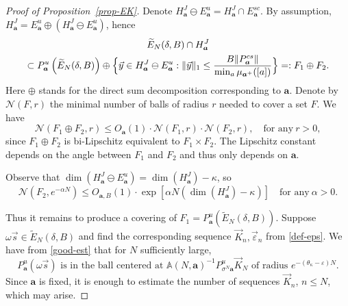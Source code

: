 \documentclass[11pt]{article}
\numberwithin{equation}{section}\newcommand{\Relation}[2][]{}\newtheorem*{prop*}{Proposition}
\newcommand{\sep}{:}
\let\epsilon\varepsilon
\theoremstyle{plain}
\theoremstyle{definition}
\let\wt\widetilde
\newcommand\bom{{\boldsymbol a}}\let\ba\bom
\let\eps\varepsilon
\let\om\omega
\let\sig\sigma
\newcommand\Ns{{\mathscr N}}
\newcommand\Aa{\mathbb{A}}
\newcommand\be{\begin{equation}}
\newcommand\ee{\end{equation}}
\begin{document}
\begin{proof}[Proof of Proposition~\ref{prop-EK}]
Denote $H_\bom^J \ominus E_\bom^u = H^J_{\bom}\cap E^{sc}_\bom$.
By assumption, $H_\bom^J = E^u_\bom \oplus (H_\bom^J \ominus E_\bom^u)$, hence
\begin{multline}
\label{eq-prod}
\wt E_N(\delta,B)\cap H_\bom^J\\
\subset P_\bom^u\left(\wt E_N(\delta,B)\right) \oplus \Bigl\{\vec y\in H_\bom^J \ominus E_\bom^u\sep \|\vec y\|_1 \le \frac{B\|P_\bom^{cs}\|}{\min_a\mu_{\bom^+}([a])}\Bigr\}=: F_1\oplus F_2.
\end{multline}
Here $\oplus$ stands for the direct sum decomposition corresponding to $\bom$. Denote by $\Ns(F,r)$ the minimal number of balls of radius $r$ needed to cover a set $F$. We have
\be \label{eq-produ2}
\Ns(F_1\oplus F_2,r) \le O_\bom(1)\cdot \Ns(F_1,r)\cdot \Ns(F_2,r),\quad \text{for any}\ r>0,
\ee
since $F_1\oplus F_2$ is bi-Lipschitz equivalent to $F_1\times F_2$. The Lipschitz constant depends on the angle between $F_1$ and $F_2$ and thus only depends on $\ba$.

Observe that $\dim(H_\bom^J \ominus E_\bom^u)=\dim(H_\bom^J)-\kappa$, so
\be \label{cover1}
\Ns(F_2,e^{-\alpha N}) \le O_{\bom,B}(1)\cdot \exp\left[\alpha N (\dim(H_\bom^J)-\kappa)\right]\quad \text{for any}\ \alpha>0.
\ee

Thus it remains to produce a covering of $F_1=P_\bom^u(\wt E_N(\delta,B))$.
Suppose $\om\vec{s} \in \wt E_N(\delta,B)$ and find the
corresponding sequence $\vec K_{n}, \vec\eps_{n}$ from \eqref{def-eps}. We have from \eqref{good-est} that for $N$ sufficiently large,
\be \label{eqrad}
\text{$P_\bom^u(\om\vec s)$ is in the ball centered at $\Aa(N,\bom)^{-1} P_{\sig^N\bom}^u \vec{K}_N$ of radius $e^{-(\theta_\kappa-\epsilon)N}$.}
\ee
Since $\bom$ is fixed, it is enough to estimate
the number of sequences $\vec K_{n}$, $n\le N$, which may arise.


\end{proof}
\end{document}
